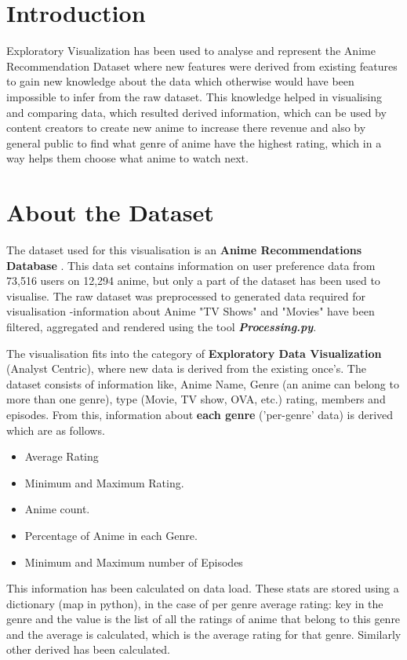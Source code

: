 \documentclass[a4paper, 10pt]{article}
\begin{document}


\section{Introduction}
    \qquad Exploratory Visualization has been used to analyse and represent the Anime Recommendation Dataset where new features were derived from existing features to gain new knowledge about the data which otherwise would have been impossible to infer from the raw dataset. This knowledge helped in visualising and comparing data, which resulted derived information, which can be used by content creators to create new anime to increase there revenue and also by general public to find what genre of anime have the highest rating, which in a way helps them choose what anime to watch next.

\section{About the Dataset}
    \qquad The dataset used for this visualisation is an \textbf{Anime Recommendations Database} \cite{anime-dataset}. This data set contains information on user preference data from 73,516 users on 12,294 anime, but only a part of the dataset has been used to visualise. The raw dataset was preprocessed to generated data required for visualisation -information about Anime "TV Shows" and "Movies" have been filtered, aggregated and rendered using the tool \textbf{\textit{Processing.py}}. 
    
    \qquad The visualisation fits into the category of \textbf{Exploratory Data Visualization} (Analyst Centric), where new data is derived from the existing once's. The dataset consists of information like, Anime Name, Genre (an anime can belong to more than one genre), type (Movie, TV show, OVA, etc.) rating, members and episodes. From this, information about \textbf{each genre} ('per-genre' data) is derived which are as follows.
    \begin{itemize}
    \item Average Rating
    \item Minimum and Maximum Rating.
    \item Anime count.
    \item Percentage of Anime in each Genre.
    \item Minimum and Maximum number of Episodes
    \end{itemize}
    \qquad This information has been calculated on data load. These stats are stored using a dictionary (map in python), in the case of per genre average rating: key in the genre and the value is the list of all the ratings of anime that belong to this genre and the average is calculated, which is the average rating for that genre. Similarly other derived has been calculated.
    
\end{document}
